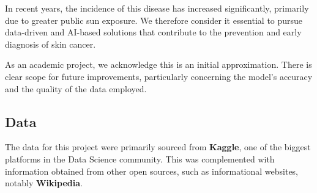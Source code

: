 \documentclass[12pt]{article}
\begin{document}
In recent years, the incidence of this disease has increased significantly, primarily due to greater public sun exposure. We therefore consider it essential to pursue data-driven and AI-based solutions that contribute to the prevention and early diagnosis of skin cancer.

As an academic project, we acknowledge this is an initial approximation. There is clear scope for future improvements, particularly concerning the model's accuracy and the quality of the data employed.

\subsection{Data}

The data for this project were primarily sourced from \textbf{Kaggle}, one of the biggest platforms in the Data Science community. This was complemented with information obtained from other open sources, such as informational websites, notably \textbf{Wikipedia}.
\end{document}

